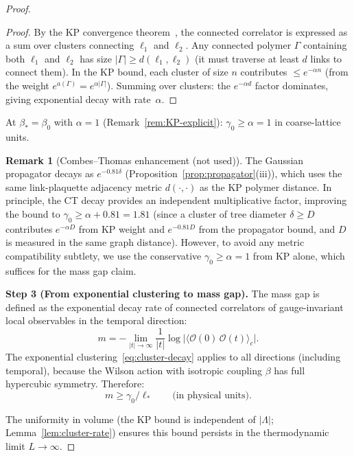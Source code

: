 \documentclass[11pt]{article}
\theoremstyle{definition}
\newtheorem{remark}[theorem]{Remark}
\begin{document}
\begin{proof}
\begin{proof}
By the KP convergence theorem~\cite{KP}, the connected
correlator is expressed as a sum over clusters connecting
$\ell_1$ and $\ell_2$.  Any connected polymer $\Gamma$
containing both $\ell_1$ and $\ell_2$ has size
$|\Gamma|\ge d(\ell_1,\ell_2)$ (it must traverse at least
$d$ links to connect them).  In the KP bound, each cluster
of size $n$ contributes $\le e^{-\alpha n}$ (from the
weight $e^{a(\Gamma)}=e^{\alpha|\Gamma|}$).  Summing over
clusters: the $e^{-\alpha d}$ factor dominates, giving
exponential decay with rate~$\alpha$.
\end{proof}

At $\beta_*=\beta_0$ with $\alpha=1$
(Remark~\ref{rem:KP-explicit}): $\gamma_0\ge\alpha=1$ in
coarse-lattice units.

\begin{remark}[Combes--Thomas enhancement (not used)]
The Gaussian propagator decays as $e^{-0.81\delta}$
(Proposition~\ref{prop:propagator}(iii)), which uses the
same link-plaquette adjacency metric $d(\cdot,\cdot)$ as
the KP polymer distance.  In principle, the CT decay provides
an independent multiplicative factor, improving the bound to
$\gamma_0\ge\alpha+0.81=1.81$ (since a cluster of tree diameter
$\delta\ge D$ contributes $e^{-\alpha D}$ from KP weight and
$e^{-0.81 D}$ from the propagator bound, and $D$ is measured
in the same graph distance).  However, to avoid any metric
compatibility subtlety, we use the conservative
$\gamma_0\ge\alpha=1$ from KP alone, which suffices for the
mass gap claim.
\end{remark}

\medskip\noindent\textbf{Step 3 (From exponential clustering to
mass gap).}
The mass gap is defined as the exponential decay rate of connected
correlators of gauge-invariant local observables in the temporal
direction:
\begin{equation}
m=-\lim_{|t|\to\infty}\frac{1}{|t|}
\log\bigl|\langle\mathcal{O}(0)\,\mathcal{O}(t)\rangle_c\bigr|.
\end{equation}
The exponential clustering~\eqref{eq:cluster-decay} applies to
all directions (including temporal), because the Wilson
action with isotropic coupling $\beta$ has full hypercubic symmetry.
Therefore:
\begin{equation}
m\ge\gamma_0/\ell_*\qquad\text{(in physical units)}.
\end{equation}

The uniformity in volume (the KP bound is independent of $|\Lambda|$;
Lemma~\ref{lem:cluster-rate})
ensures this bound persists in the thermodynamic limit $L\to\infty$.


\end{proof}
\end{document}
